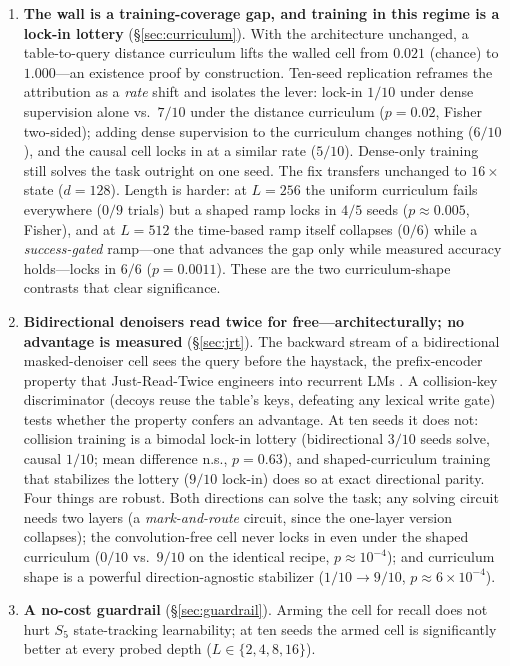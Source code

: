 \documentclass{article}
\begin{document}
\begin{enumerate}[leftmargin=1.4em,itemsep=2pt]
\item \textbf{The wall is a training-coverage gap, and training in this regime is a lock-in lottery} (\S\ref{sec:curriculum}). With the architecture unchanged, a table-to-query distance curriculum lifts the walled cell from $0.021$ (chance) to $1.000$---an existence proof by construction. Ten-seed replication reframes the attribution as a \emph{rate} shift and isolates the lever: lock-in $1/10$ under dense supervision alone vs.\ $7/10$ under the distance curriculum ($p{=}0.02$, Fisher two-sided); adding dense supervision to the curriculum changes nothing ($6/10$), and the causal cell locks in at a similar rate ($5/10$). Dense-only training still solves the task outright on one seed. The fix transfers unchanged to $16\times$ state ($d{=}128$). Length is harder: at $L{=}256$ the uniform curriculum fails everywhere ($0/9$ trials) but a shaped ramp locks in $4/5$ seeds ($p{\approx}0.005$, Fisher), and at $L{=}512$ the time-based ramp itself collapses ($0/6$) while a \emph{success-gated} ramp---one that advances the gap only while measured accuracy holds---locks in $6/6$ ($p{=}0.0011$). These are the two curriculum-shape contrasts that clear significance.
\item \textbf{Bidirectional denoisers read twice for free---architecturally; no advantage is measured} (\S\ref{sec:jrt}). The backward stream of a bidirectional masked-denoiser cell sees the query before the haystack, the prefix-encoder property that Just-Read-Twice engineers into recurrent LMs \citep{arora2024jrt}. A collision-key discriminator (decoys reuse the table's keys, defeating any lexical write gate) tests whether the property confers an advantage. At ten seeds it does not: collision training is a bimodal lock-in lottery (bidirectional $3/10$ seeds solve, causal $1/10$; mean difference n.s., $p{=}0.63$), and shaped-curriculum training that stabilizes the lottery ($9/10$ lock-in) does so at exact directional parity. Four things are robust. Both directions can solve the task; any solving circuit needs two layers (a \emph{mark-and-route} circuit, since the one-layer version collapses); the convolution-free cell never locks in even under the shaped curriculum ($0/10$ vs.\ $9/10$ on the identical recipe, $p{\approx}10^{-4}$); and curriculum shape is a powerful direction-agnostic stabilizer ($1/10 \to 9/10$, $p{\approx}6{\times}10^{-4}$).
\item \textbf{A no-cost guardrail} (\S\ref{sec:guardrail}). Arming the cell for recall does not hurt $S_5$ state-tracking learnability; at ten seeds the armed cell is significantly better at every probed depth ($L\in\{2,4,8,16\}$).
\end{enumerate}
\end{document}
